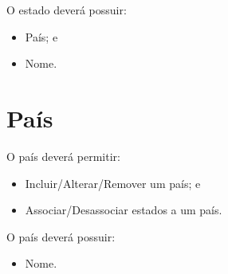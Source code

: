 O estado deverá possuir:

\begin{itemize}
	\item País; e
	\item Nome.
\end{itemize}

\section{País}

O país deverá permitir:

\begin{itemize}
	\item Incluir/Alterar/Remover um país; e
	\item Associar/Desassociar estados a um país.
\end{itemize}

O país deverá possuir:

\begin{itemize}
	\item Nome.
\end{itemize}
